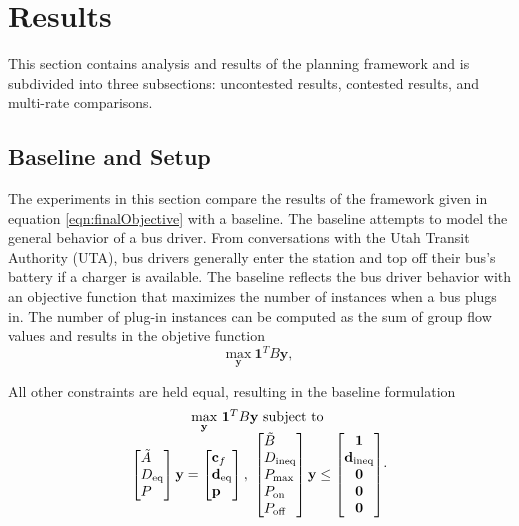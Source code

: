 \section{Results}
This section contains analysis and results of the planning framework and is subdivided into three subsections: uncontested results, contested results, and multi-rate comparisons.  
\subsection{Baseline and Setup}
The experiments in this section compare the results of the framework given in equation \ref{eqn:finalObjective} with a baseline. The baseline attempts to model the general behavior of a bus driver. From conversations with the Utah Transit Authority (UTA), bus drivers generally enter the station and top off their bus's battery if a charger is available. The baseline reflects the bus driver behavior with an objective function that maximizes the number of instances when a bus plugs in. The number of plug-in instances can be computed as the sum of group flow values and results in the objetive function
\begin{equation}
	\underset{\mathbf{y}}{\text{max}} \ \mathbf{1}^TB\mathbf{y},
\end{equation}
\par All other constraints are held equal, resulting in the baseline formulation 
\begin{equation}\label{eqn:finalBaselineObjective}
	\begin{matrix*}[c]
		\underset{\mathbf{y}}{\scalebox{1}{\text{max}}} \ \mathbf{1}^TB\mathbf{y} \ \text{subject to}\\
		\begin{bmatrix*}[l]
				\tilde{A} \\
				D_{\text{eq}} \\
				P
				\end{bmatrix*} \mathbf{y} = \begin{bmatrix*}[l]\mathbf{c}_f \\ \mathbf{d}_{\text{eq}}\\\mathbf{p} \end{bmatrix*}, \ \begin{bmatrix*}[l]
			\tilde{B} \\
			D_{\text{ineq}} \\ 
			P_{\text{max}} \\
			P_{\text{on}} \\
			P_{\text{off}}
			\end{bmatrix*}\mathbf{y} \le \begin{bmatrix*}\mathbf{1} \\ \mathbf{d}_{\text{ineq}} \\ \mathbf{0} \\ \mathbf{0} \\ \mathbf{0} \end{bmatrix*}
	\end{matrix*}.
\end{equation}
